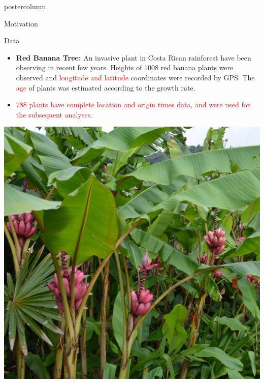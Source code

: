 \documentclass[final]{beamer}\usepackage[]{graphicx}\usepackage[]{color}
\newcommand{\red}{\textcolor{red}}
\begin{document}
{\begin{frame}
\begin{columns}
\begin{column}{.33\textwidth}
\begin{beamercolorbox}[center,wd=\textwidth]{postercolumn}
\begin{minipage}[T]{.97\textwidth}
{\begin{block}{Motivation}
	
\end{block}
\vfill


\begin{block}{Data}
	
\begin{itemize}
	\item \textbf{Red Banana Tree:} An invasive plant in Costa Rican rainforest have been observing in recent few years. Heights of 1008 red banana plants were observed and \red{longitude and latitude} coordinates were recorded by GPS. The \red{age} of plants was estimated according to the growth rate. 
  \vspace{0.4cm}
	\item \red{788 plants have complete location and origin times data, and were used for the subsequent analyses}.
\end{itemize}
  \vspace{0.4cm} \hspace{0.5cm}
  \includegraphics[scale=0.24]{redbanana3.jpg}
  \hspace{1cm}

\end{block}}
\end{minipage}
\end{beamercolorbox}
\end{column}
\end{columns}
\end{frame}}
\end{document}
